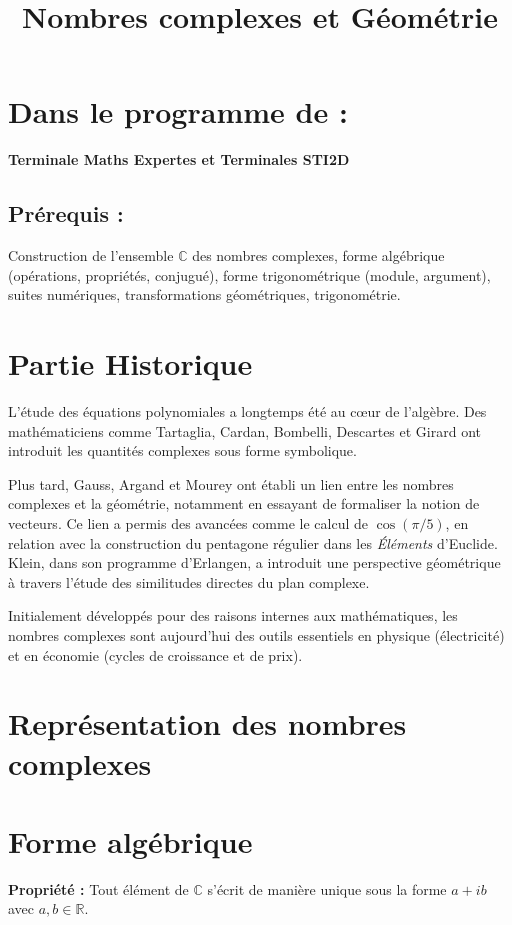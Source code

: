 \documentclass[a4paper,12pt]{article}
\title{Nombres complexes et Géométrie}
\begin{document}
    \maketitle

    \section*{Dans le programme de :}
    \textbf{Terminale Maths Expertes et Terminales STI2D}

    \subsection*{Prérequis :}
    Construction de l’ensemble $\mathbb{C}$ des nombres complexes, forme algébrique (opérations, propriétés, conjugué), forme trigonométrique (module, argument), suites numériques, transformations géométriques, trigonométrie.

\section*{Partie Historique}

L'étude des équations polynomiales a longtemps été au cœur de l'algèbre. Des mathématiciens comme Tartaglia, Cardan, Bombelli, Descartes et Girard ont introduit les quantités complexes sous forme symbolique.

Plus tard, Gauss, Argand et Mourey ont établi un lien entre les nombres complexes et la géométrie, notamment en essayant de formaliser la notion de vecteurs. Ce lien a permis des avancées comme le calcul de $\cos(\pi/5)$, en relation avec la construction du pentagone régulier dans les \emph{Éléments} d'Euclide. Klein, dans son programme d'Erlangen, a introduit une perspective géométrique à travers l'étude des similitudes directes du plan complexe.

Initialement développés pour des raisons internes aux mathématiques, les nombres complexes sont aujourd'hui des outils essentiels en physique (électricité) et en économie (cycles de croissance et de prix).



    \section*{Représentation des nombres complexes}
    \section{Forme algébrique}
    \textbf{Propriété :} Tout élément de $\mathbb{C}$ s’écrit de manière unique sous la forme $a + ib$ avec $a, b \in \mathbb{R}$.
\end{document}
